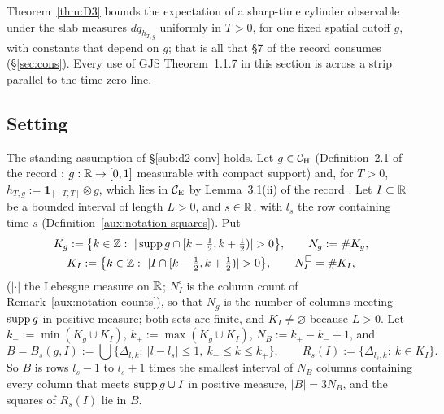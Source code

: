 
Theorem~\ref{thm:D3} bounds the expectation of a sharp-time cylinder observable under the slab
measures $dq_{h_{T,g}}$ uniformly in $T>0$, for one fixed spatial cutoff $g$, with constants that
depend on $g$; that is all that \S7 of the record consumes (\S\ref{sec:cons}).  Every use of GJS
Theorem~1.1.7 in this section is across a strip parallel to the time-zero line.

\subsection{Setting}\label{sub:d3-setting}

The standing assumption of \S\ref{sub:d2-conv} holds.  Let $g\in\mathcal{C}_{\mathrm H}$ (Definition~2.1 of the record
\cite[p.~7]{R}: $g:\mathbb{R}\to[0,1]$ measurable with compact support) and, for $T>0$,
$h_{T,g}:=\mathbf 1_{[-T,T]}\otimes g$, which lies in $\mathcal{C}_{\mathrm E}$ by Lemma~3.1(ii) of the record
\cite[p.~15]{R}.  Let $I\subset\mathbb{R}$ be a bounded interval of length $L>0$, and $s\in\mathbb{R}$, with
$l_s$ the row containing time $s$ (Definition~\ref{aux:notation-squares}).  Put
\begin{gather*}
 K_g:=\bigl\{k\in\Z:\ |\supp g\cap[k-\tfrac12,k+\tfrac12)|>0\bigr\},\qquad N_g:=\#K_g ,\\
 K_I:=\bigl\{k\in\Z:\ |I\cap[k-\tfrac12,k+\tfrac12)|>0\bigr\},\qquad N^{\square}_I=\#K_I ,
\end{gather*}
($|\cdot|$ the Lebesgue measure on $\mathbb{R}$; $N^\square_I$ is the column count of
Remark~\ref{aux:notation-counts}), so that $N_g$ is the number of columns meeting $\operatorname{supp} g$ in
positive measure; both sets are finite, and $K_I\ne\varnothing$ because $L>0$.  Let
$k_-:=\min(K_g\cup K_I)$, $k_+:=\max(K_g\cup K_I)$, $N_B:=k_+-k_-+1$, and
\[
 B=B_s(g,I):=\bigcup\{\Delta_{l,k}:\ |l-l_s|\le1,\ k_-\le k\le k_+\},\qquad
 R_s(I):=\{\Delta_{l_s,k}:\ k\in K_I\} .
\]
So $B$ is rows $l_s-1$ to $l_s+1$ times the smallest interval of $N_B$ columns containing every
column that meets $\operatorname{supp} g\cup I$ in positive measure, $|B|=3N_B$, and the squares of $R_s(I)$
lie in $B$.

